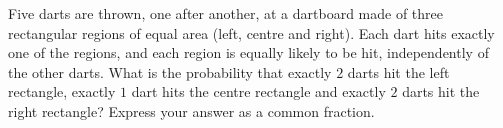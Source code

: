 Five darts are thrown, one after another, at a dartboard made of three rectangular regions of equal area (left, centre and right). Each dart hits exactly one of the regions, and each region is equally likely to be hit, independently of the other darts. What is the probability that exactly $2$ darts hit the left rectangle, exactly $1$ dart hits the centre rectangle and exactly $2$ darts hit the right rectangle? Express your answer as a common fraction.
